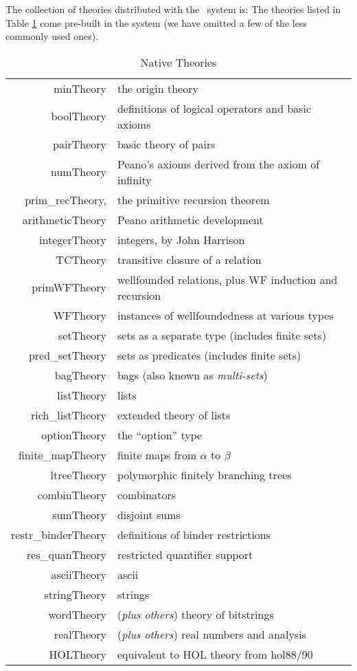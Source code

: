 The collection of theories distributed with the \HOL\ system
is:
The theories listed in Table \ref{nativeTheories} come
pre-built in the system (we have omitted a few of the less commonly used
ones).
\begin{table}
\begin{center}
\begin{tabular}{|r|l|} \hline
minTheory & the origin theory \\
boolTheory & definitions of logical operators and basic axioms \\
pairTheory & basic theory of pairs \\
numTheory & Peano's axioms derived from the axiom of infinity \\
prim\_recTheory, & the primitive recursion theorem \\
arithmeticTheory & Peano arithmetic development \\
integerTheory & integers, by John Harrison \\
TCTheory & transitive closure of a relation \\
primWFTheory & wellfounded relations, plus WF induction and recursion \\
WFTheory & instances of wellfoundedness at various types \\
setTheory & sets as a separate type (includes finite sets) \\
pred\_setTheory & sets as predicates (includes finite sets) \\
bagTheory & bags (also known as \emph{multi-sets})\\
listTheory & lists  \\
rich\_listTheory & extended theory of lists \\
optionTheory & the ``option'' type \\
finite\_mapTheory & finite maps from $\alpha$ to $\beta$ \\
ltreeTheory & polymorphic finitely branching trees \\
combinTheory & combinators \\
sumTheory & disjoint sums \\
restr\_binderTheory & definitions of binder restrictions \\
res\_quanTheory & restricted quantifier support \\
asciiTheory & ascii \\
stringTheory & strings \\
wordTheory & ({\it plus others}) theory of bitstrings \\
realTheory & ({\it plus others}) real numbers and analysis \\
HOLTheory & equivalent to HOL theory from hol88/90\\  \hline
\end{tabular}
\caption{Native Theories}\label{nativeTheories}
\end{center}
\end{table}

